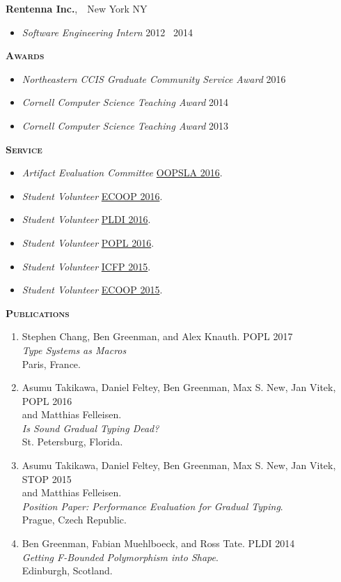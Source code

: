 \documentclass{article}
\newcommand{\mysection}[1]{\vspace{0.5cm}
\hspace{-1.3cm}\textsc{\textbf{#1}}~\hrulefill}
\newcommand{\mysubsection}[1]{\hspace{-0.7cm}\textbf{#1}}
\begin{document}
\mysubsection{Rentenna Inc.},~~New York NY
\begin{itemize}
\item \emph{Software Engineering Intern} \hfill 2012 \textendash\ 2014
\end{itemize}

\newpage
\mysection{Awards} %
\begin{itemize}
\item \emph{Northeastern CCIS Graduate Community Service Award} \hfill 2016
\item \emph{Cornell Computer Science Teaching Award} \hfill 2014
\item \emph{Cornell Computer Science Teaching Award} \hfill 2013
\end{itemize}



\mysection{Service}
\begin{itemize}
\item \emph{Artifact Evaluation Committee} \hfill \href{http://2016.splashcon.org/track/splash-2016-artifacts}{OOPSLA 2016}.
\item \emph{Student Volunteer} \hfill \href{http://2016.ecoop.org/}{ECOOP 2016}.
\item \emph{Student Volunteer} \hfill \href{http://conf.researchr.org/home/PLDI-2016}{PLDI 2016}.
\item \emph{Student Volunteer} \hfill \href{http://conf.researchr.org/home/POPL-2016}{POPL 2016}.
\item \emph{Student Volunteer} \hfill \href{http://icfpconference.org/icfp2015/}{ICFP 2015}.
\item \emph{Student Volunteer} \hfill \href{http://2015.ecoop.org/}{ECOOP 2015}.
\end{itemize}


\mysection{Publications}
\begin{enumerate}
\item
  Stephen Chang, Ben Greenman, and Alex Knauth. \hfill POPL 2017 \\
   \emph{Type Systems as Macros} \\
  Paris, France.
\item
  Asumu Takikawa, Daniel Feltey, Ben Greenman, Max S. New, Jan Vitek, \hfill POPL 2016 \\
   and Matthias Felleisen. \\
   \emph{Is Sound Gradual Typing Dead?} \\
  St. Petersburg, Florida.
\item
  Asumu Takikawa, Daniel Feltey, Ben Greenman, Max S. New, Jan Vitek, \hfill STOP 2015 \\
   and Matthias Felleisen. \\
   \emph{Position Paper: Performance Evaluation for Gradual Typing}. \\
  Prague, Czech Republic.
\item
  Ben Greenman, Fabian Muehlboeck, and Ross Tate. \hfill PLDI 2014 \\
  \emph{Getting F-Bounded Polymorphism into Shape}. \\
  Edinburgh, Scotland.
\end{enumerate}
\end{document}
